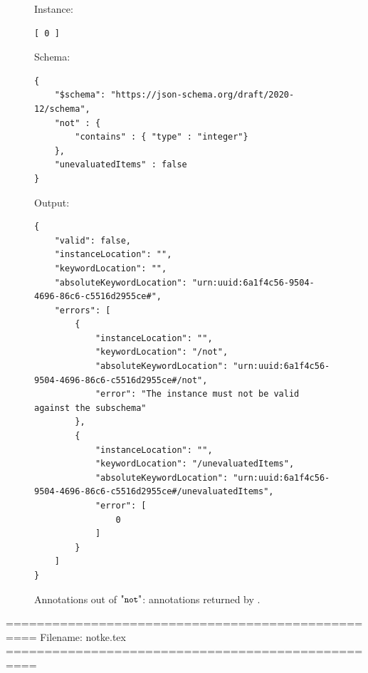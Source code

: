 \begin{figure}
\small

Instance:
\begin{querybox}{}
\begin{lstlisting}[style=querynonumbers]
[ 0 ]
\end{lstlisting}
\end{querybox}


Schema:
\begin{querybox}{}
\begin{lstlisting}[style=query]
{
	"$schema": "https://json-schema.org/draft/2020-12/schema",
	"not" : {
	    "contains" : { "type" : "integer"}
	},
	"unevaluatedItems" : false
}
\end{lstlisting}
\end{querybox}
 
Output:
\begin{querybox}{}
\begin{lstlisting}[style=query]
{
    "valid": false,
    "instanceLocation": "",
    "keywordLocation": "",
    "absoluteKeywordLocation": "urn:uuid:6a1f4c56-9504-4696-86c6-c5516d2955ce#",
    "errors": [
        {
            "instanceLocation": "",
            "keywordLocation": "/not",
            "absoluteKeywordLocation": "urn:uuid:6a1f4c56-9504-4696-86c6-c5516d2955ce#/not",
            "error": "The instance must not be valid against the subschema"
        },
        {
            "instanceLocation": "",
            "keywordLocation": "/unevaluatedItems",
            "absoluteKeywordLocation": "urn:uuid:6a1f4c56-9504-4696-86c6-c5516d2955ce#/unevaluatedItems",
            "error": [
                0
            ]
        }
    ]
}
\end{lstlisting}
\end{querybox}

\caption{Annotations out of $\qnot$: annotations returned by {\JS}.}
\label{fig:notjs}
\end{figure}



==================================================
Filename: notke.tex
==================================================



